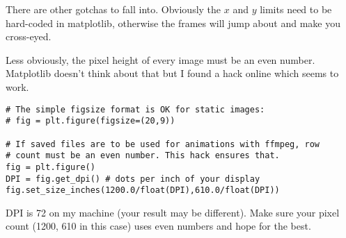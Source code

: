 There are other gotchas to fall into. Obviously the $x$ and $y$ limits need to be hard-coded in matplotlib, otherwise the frames will jump about and make you cross-eyed. 

Less obviously, the pixel height of every image must be an even number. Matplotlib doesn't think about that but I found a hack online which seems to work.

\begin{lstlisting}
# The simple figsize format is OK for static images:
# fig = plt.figure(figsize=(20,9))

# If saved files are to be used for animations with ffmpeg, row
# count must be an even number. This hack ensures that.
fig = plt.figure()
DPI = fig.get_dpi() # dots per inch of your display
fig.set_size_inches(1200.0/float(DPI),610.0/float(DPI))
\end{lstlisting}

DPI is 72 on my machine (your result may be different). Make sure your pixel count (1200, 610 in this case) uses even numbers and hope for the best.



